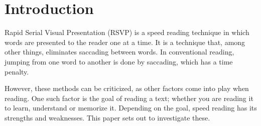 \section{Introduction}
Rapid Serial Visual Presentation (RSVP) is a speed reading technique in which words are presented to the reader one at a time. It is a technique that, among other things, eliminates saccading between words. In conventional reading, jumping from one word to another is done by saccading, which has a time penalty.

However, these methods can be criticized, as other factors come into play when reading. One such factor is the goal of reading a text; whether you are reading it to learn, understand or memorize it. Depending on the goal, speed reading has its strengths and weaknesses. This paper sets out to investigate these.
